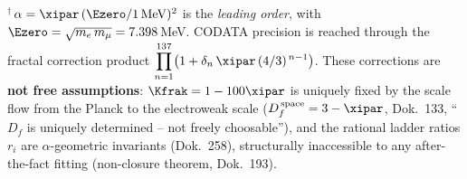 \begin{table}[htbp]
  \centering
  \caption{The surviving dimensionless inputs of physics and their derivation from
           the single parameter $\xipar=\tfrac{4}{3}\times10^{-4}$. All relations
           are sourced.}
  \label{tab:xi-inputs-en}
  {\footnotesize\setlength{\tabcolsep}{4pt}
  }

  \medskip
  \footnotesize
  $^{\dagger}$\,$\alpha=\xipar\,(\Ezero/1\,\mathrm{MeV})^2$ is the \emph{leading order},
  with $\Ezero=\sqrt{m_e\,m_\mu}=7{.}398$\,MeV.
  CODATA precision is reached through the fractal correction product
  $\displaystyle\prod_{n=1}^{137}\!\big(1+\delta_n\,\xipar\,(4/3)^{\,n-1}\big)$.
  These corrections are \textbf{not free assumptions}: $\Kfrak=1-100\xipar$ is uniquely
  fixed by the scale flow from the Planck to the electroweak scale
  ($D_f^{\,\mathrm{space}}=3-\xipar$, Dok.~133, ``$D_f$ is uniquely determined --
  not freely choosable''), and the rational ladder ratios $r_i$ are
  $\alpha$-geometric invariants (Dok.~258), structurally inaccessible to any
  after-the-fact fitting (non-closure theorem, Dok.~193).
\end{table}

